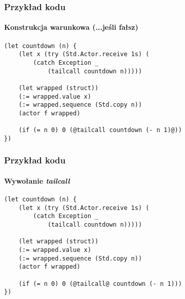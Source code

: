\documentclass{beamer}
\begin{document}
\begin{frame}[fragile]
    \frametitle{Przykład kodu}
    \framesubtitle{Konstrukcja warunkowa (...jeśli fałsz)}

    \begin{small}
    \begin{lstlisting}
(let countdown (n) {
    (let x (try (Std.Actor.receive 1s) (
        (catch Exception _
            (tailcall countdown n)))))

    (let wrapped (struct))
    (:= wrapped.value x)
    (:= wrapped.sequence (Std.copy n))
    (actor f wrapped)

    (if (= n 0) 0 (@tailcall countdown (- n 1)@))
})
    \end{lstlisting}
    \end{small}
\end{frame}

\begin{frame}[fragile]
    \frametitle{Przykład kodu}
    \framesubtitle{Wywołanie \emph{tailcall}}

    \begin{small}
    \begin{lstlisting}
(let countdown (n) {
    (let x (try (Std.Actor.receive 1s) (
        (catch Exception _
            (tailcall countdown n)))))

    (let wrapped (struct))
    (:= wrapped.value x)
    (:= wrapped.sequence (Std.copy n))
    (actor f wrapped)

    (if (= n 0) 0 (@tailcall@ countdown (- n 1)))
})
    \end{lstlisting}
    \end{small}
\end{frame}

\end{document}
